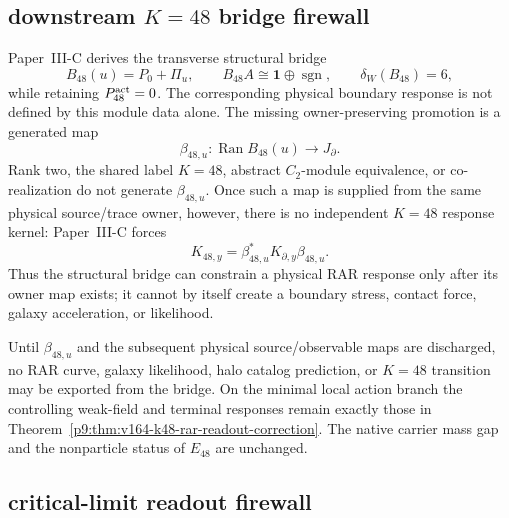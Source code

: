 \documentclass[12pt,a4paper]{article}
\begin{document}
\subsection{downstream \(K=48\) bridge firewall}
\label{p9:sec:v166-k48-transverse-bridge-firewall}

\begin{theorem}
\label{p9:thm:v166-structural-bridge-rar-firewall}
Paper~III-C derives the transverse structural bridge
\[
 B_{48}(u)=P_0+\Pi_u,
 \qquad
 B_{48}A\cong\mathbf1\oplus\operatorname{sgn},
 \qquad
 \delta_W(B_{48})=6,
\]
while retaining \(P_{48}^{\rm act}=0\).  The corresponding physical boundary
response is not defined by this module data alone.  The missing owner-preserving
promotion is a generated map
\[
 \boxed{
 \beta_{48,u}:\operatorname{Ran}B_{48}(u)\longrightarrow J_\partial .}
\]
Rank two, the shared label \(K=48\), abstract \(C_2\)-module equivalence, or
co-realization do not generate \(\beta_{48,u}\).  Once such a map is supplied
from the same physical source/trace owner, however, there is no independent
\(K=48\) response kernel: Paper~III-C forces
\[
 \boxed{
 K_{48,y}=\beta_{48,u}^{*}K_{\partial,y}\beta_{48,u}.}
\]
Thus the structural bridge can constrain a physical RAR response only after
its owner map exists; it cannot by itself create a boundary stress, contact
force, galaxy acceleration, or likelihood.

Until \(\beta_{48,u}\) and the subsequent physical source/observable maps are
discharged, no RAR curve, galaxy likelihood, halo catalog prediction, or
\(K=48\) transition may be exported from the bridge.  On the minimal local
action branch the controlling weak-field and terminal responses remain exactly
those in Theorem~\ref{p9:thm:v164-k48-rar-readout-correction}.  The native
carrier mass gap and the nonparticle status of \(E_{48}\) are unchanged.
\end{theorem}

\subsection{critical-limit readout firewall}
\label{p9:sec:v167-rar-limit-firewall}
\end{document}
